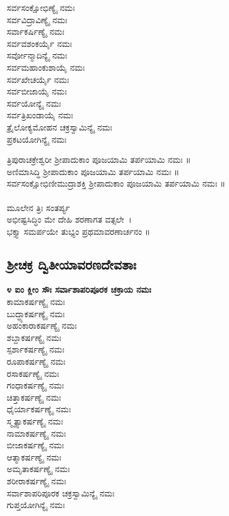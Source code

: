  ಸರ್ವಸಂಕ್ಷೋಭಿಣ್ಯೈ ನಮಃ\\
 ಸರ್ವವಿದ್ರಾವಿಣ್ಯೈ ನಮಃ\\
 ಸರ್ವಾಕರ್ಷಿಣ್ಯೈ ನಮಃ\\
 ಸರ್ವವಶಂಕರ್ಯೈ ನಮಃ\\
 ಸರ್ವೋನ್ಮಾದಿನ್ಯೈ ನಮಃ\\
 ಸರ್ವಮಹಾಂಕುಶಾಯೈ ನಮಃ\\
 ಸರ್ವಖೇಚರ್ಯೈ ನಮಃ\\
 ಸರ್ವಬೀಜಾಯೈ ನಮಃ\\
 ಸರ್ವಯೋನ್ಯೈ ನಮಃ\\
 ಸರ್ವತ್ರಿಖಂಡಾಯೈ ನಮಃ\\
 ತ್ರೈಲೋಕ್ಯಮೋಹನ ಚಕ್ರಸ್ವಾಮಿನ್ಯೈ ನಮಃ\\
ಪ್ರಕಟಯೋಗಿನ್ಯೈ ನಮಃ

 ತ್ರಿಪುರಾಚಕ್ರೇಶ್ವರೀ ಶ್ರೀಪಾದುಕಾಂ ಪೂಜಯಾಮಿ ತರ್ಪಯಾಮಿ ನಮಃ ॥\\
 ಅಣಿಮಾಸಿದ್ಧಿ ಶ್ರೀಪಾದುಕಾಂ ಪೂಜಯಾಮಿ ತರ್ಪಯಾಮಿ ನಮಃ ॥\\
 ಸರ್ವಸಂಕ್ಷೋಭಿಣೀಮುದ್ರಾಶಕ್ತಿ ಶ್ರೀಪಾದುಕಾಂ ಪೂಜಯಾಮಿ ತರ್ಪಯಾಮಿ ನಮಃ ॥\\
\\
ಮೂಲೇನ ತ್ರಿಃ ಸಂತರ್ಪ್ಯ\\
 ಅಭೀಷ್ಟಸಿದ್ಧಿಂ ಮೇ ದೇಹಿ ಶರಣಾಗತ ವತ್ಸಲೇ~।\\
ಭಕ್ತ್ಯಾ ಸಮರ್ಪಯೇ ತುಭ್ಯಂ ಪ್ರಥಮಾವರಣಾರ್ಚನಂ ॥
\subsection{ಶ್ರೀಚಕ್ರ ದ್ವಿತೀಯಾವರಣದೇವತಾಃ}
{\bfseries ೪ ಐಂ ಕ್ಲೀಂ ಸೌಃ ಸರ್ವಾಶಾಪರಿಪೂರಕ ಚಕ್ರಾಯ ನಮಃ}\\
 ಕಾಮಾಕರ್ಷಣ್ಯೈ ನಮಃ\\
 ಬುದ್ಧ್ಯಾಕರ್ಷಣ್ಯೈ ನಮಃ\\
 ಅಹಂಕಾರಾಕರ್ಷಣ್ಯೈ ನಮಃ\\
 ಶಬ್ದಾಕರ್ಷಣ್ಯೈ ನಮಃ\\
 ಸ್ಪರ್ಶಾಕರ್ಷಣ್ಯೈ ನಮಃ\\
 ರೂಪಾಕರ್ಷಣ್ಯೈ ನಮಃ\\
 ರಸಾಕರ್ಷಣ್ಯೈ ನಮಃ\\
 ಗಂಧಾಕರ್ಷಣ್ಯೈ ನಮಃ\\
 ಚಿತ್ತಾಕರ್ಷಣ್ಯೈ ನಮಃ\\
 ಧೈರ್ಯಾಕರ್ಷಣ್ಯೈ ನಮಃ\\
 ಸ್ಮೃತ್ಯಾಕರ್ಷಣ್ಯೈ ನಮಃ\\
 ನಾಮಾಕರ್ಷಣ್ಯೈ ನಮಃ\\
 ಬೀಜಾಕರ್ಷಣ್ಯೈ ನಮಃ\\
 ಆತ್ಮಾಕರ್ಷಣ್ಯೈ ನಮಃ\\
 ಅಮೃತಾಕರ್ಷಣ್ಯೈ ನಮಃ\\
 ಶರೀರಾಕರ್ಷಣ್ಯೈ ನಮಃ\\
 ಸರ್ವಾಶಾಪರಿಪೂರಕ ಚಕ್ರಸ್ವಾಮಿನ್ಯೈ ನಮಃ\\
ಗುಪ್ತಯೋಗಿನ್ಯೈ ನಮಃ

